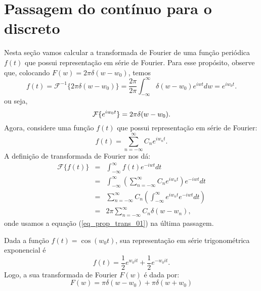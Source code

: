 \section{Passagem do contínuo para o discreto}
Nesta seção vamos calcular a transformada de Fourier de uma função periódica $f(t)$ que possui representação em série de Fourier. Para esse propósito, observe que, colocando $F(w)=2\pi \delta(w-w_0)$, temos 
\begin{equation*}
f(t)=\mathcal{F}^{-1}\{2\pi\delta(w-w_0)\}=\frac{2\pi}{2\pi}\int_{-\infty}^\infty \delta(w-w_0)e^{iwt}dw=e^{iw_0t}.
\end{equation*}
ou seja,
\begin{equation}{\label{eq_prop_trans_01}}
\mathcal{F}\{e^{iw_0t}\}=2\pi\delta(w-w_0).
\end{equation}
Agora, considere uma função $f(t)$ que possui representação em série de Fourier:
$$
f(t)=\sum_{n=-\infty}^\infty C_n e^{iw_nt}.
$$
A definição de transformada de Fourier nos dá:
\begin{eqnarray*}
\mathcal{F}\{f(t)\}&=&\int_{-\infty}^\infty f(t) e^{-iwt}dt\\
&=&\int_{-\infty}^\infty\left( \sum_{n=-\infty}^\infty C_n e^{iw_nt}\right) e^{-iwt}dt\\
&=& \sum_{n=-\infty}^\infty C_n \left(\int_{-\infty}^\infty e^{iw_nt}e^{-iwt} dt \right)\\
&=&2\pi \sum_{n=-\infty}^\infty C_n \delta(w-w_n) ,
\end{eqnarray*}
onde usamos a equação (\ref{eq_prop_trans_01}) na última passagem.
\begin{ex}{\label{ex_ant}} Dada a função $f(t)=\cos(w_0t)$, sua representação em série trigonométrica exponencial é
$$
f(t)=\frac{1}{2}e^{w_0it}+\frac{1}{2}e^{-w_0it}.
$$
Logo, a sua transformada de Fourier $F(w)$ é dada por:
$$
F(w)=\pi\delta(w-w_0)+\pi\delta(w+w_0)
$$
\end{ex}

